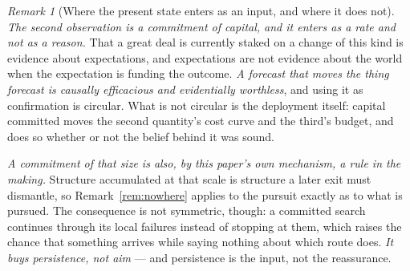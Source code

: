\documentclass[11pt,a4paper]{article}
\theoremstyle{remark}
\newtheorem{remark}[definition]{Remark}
\begin{document}
\begin{remark}[Where the present state enters as an input, and where it does not]
\emph{The second observation is a commitment of capital, and it enters as a rate and not as a reason.}
That a great deal is currently staked on a change of this kind is evidence about expectations, and
expectations are not evidence about the world when the expectation is funding the outcome. \emph{A
forecast that moves the thing forecast is causally efficacious and evidentially worthless}, and using
it as confirmation is circular. What is not circular is the deployment itself: capital committed moves
the second quantity's cost curve and the third's budget, and does so whether or not the belief behind
it was sound.

\emph{A commitment of that size is also, by this paper's own mechanism, a rule in the making.}
Structure accumulated at that scale is structure a later exit must dismantle, so
Remark~\ref{rem:nowhere} applies to the pursuit exactly as to what is pursued. The consequence is not
symmetric, though: a committed search continues through its local failures instead of stopping at them,
which raises the chance that something arrives while saying nothing about which route does. \emph{It
buys persistence, not aim} --- and persistence is the input, not the reassurance.
\end{remark}
\end{document}
